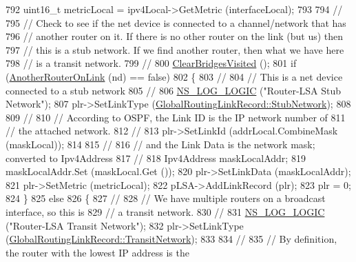 \begin{DoxyCode}
792   uint16\_t metricLocal = ipv4Local->GetMetric (interfaceLocal);
793 
794   \textcolor{comment}{//}
795   \textcolor{comment}{// Check to see if the net device is connected to a channel/network that has}
796   \textcolor{comment}{// another router on it.  If there is no other router on the link (but us) then}
797   \textcolor{comment}{// this is a stub network.  If we find another router, then what we have here}
798   \textcolor{comment}{// is a transit network.}
799   \textcolor{comment}{//}
800   \hyperlink{classns3_1_1GlobalRouter_a2519d9ebeb7425ffe4569c6ed0eaf4cf}{ClearBridgesVisited} ();
801   \textcolor{keywordflow}{if} (\hyperlink{classns3_1_1GlobalRouter_ae2af74f394b3b8de4daad7000fb0b9f7}{AnotherRouterOnLink} (nd) == \textcolor{keyword}{false})
802     \{
803       \textcolor{comment}{//}
804       \textcolor{comment}{// This is a net device connected to a stub network}
805       \textcolor{comment}{//}
806       \hyperlink{group__logging_ga88acd260151caf2db9c0fc84997f45ce}{NS\_LOG\_LOGIC} (\textcolor{stringliteral}{"Router-LSA Stub Network"});
807       plr->SetLinkType (\hyperlink{classns3_1_1GlobalRoutingLinkRecord_a9380bcce9bca03943c4761b166a694f4a183ff8c880e05253fdca7bece2cad90b}{GlobalRoutingLinkRecord::StubNetwork});
808 
809       \textcolor{comment}{// }
810       \textcolor{comment}{// According to OSPF, the Link ID is the IP network number of }
811       \textcolor{comment}{// the attached network.}
812       \textcolor{comment}{//}
813       plr->SetLinkId (addrLocal.CombineMask (maskLocal));
814 
815       \textcolor{comment}{//}
816       \textcolor{comment}{// and the Link Data is the network mask; converted to Ipv4Address}
817       \textcolor{comment}{//}
818       Ipv4Address maskLocalAddr;
819       maskLocalAddr.Set (maskLocal.Get ());
820       plr->SetLinkData (maskLocalAddr);
821       plr->SetMetric (metricLocal);
822       pLSA->AddLinkRecord (plr);
823       plr = 0;
824     \}
825   \textcolor{keywordflow}{else}
826     \{
827       \textcolor{comment}{//}
828       \textcolor{comment}{// We have multiple routers on a broadcast interface, so this is}
829       \textcolor{comment}{// a transit network.}
830       \textcolor{comment}{//}
831       \hyperlink{group__logging_ga88acd260151caf2db9c0fc84997f45ce}{NS\_LOG\_LOGIC} (\textcolor{stringliteral}{"Router-LSA Transit Network"});
832       plr->SetLinkType (\hyperlink{classns3_1_1GlobalRoutingLinkRecord_a9380bcce9bca03943c4761b166a694f4ad3d00014c9ba50539a53b55fce117856}{GlobalRoutingLinkRecord::TransitNetwork});
833 
834       \textcolor{comment}{// }
835       \textcolor{comment}{// By definition, the router with the lowest IP address is the}

\end{DoxyCode}
